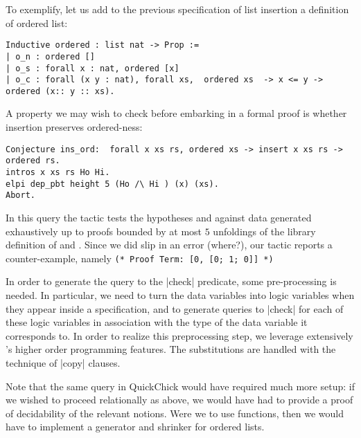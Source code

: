 To exemplify, let us add to the previous specification of list
insertion a definition of ordered list:
\begin{lstlisting}
Inductive ordered : list nat -> Prop :=
| o_n : ordered []
| o_s : forall x : nat, ordered [x]
| o_c : forall (x y : nat), forall xs,  ordered xs  -> x <= y -> ordered (x:: y :: xs).     
\end{lstlisting}
%
A property we may wish to check before embarking in a formal proof is whether insertion preserves ordered-ness:
\begin{lstlisting}
Conjecture ins_ord:  forall x xs rs, ordered xs -> insert x xs rs -> ordered rs.
intros x xs rs Ho Hi.
elpi dep_pbt height 5 (Ho /\ Hi ) (x) (xs).
Abort.
\end{lstlisting}
In this query the tactic tests the hypotheses  and 
against data  generated exhaustively up to proofs bounded
by at most $5$ unfoldings of the library  definition
of  and . Since we did slip in an error (where?), our
tactic reports a counter-example, namely
\verb|(* Proof Term: [0, [0; 1; 0]] *)|


In order to generate the query to the \lsti|check| predicate, some
pre-processing is needed. In particular, we need to turn the data
variables into \lP logic variables when they appear inside a
specification, and to generate queries to \lsti|check| for each of
these logic variables in association with the type of the data
variable it corresponds to.  In order to realize this preprocessing step,
we leverage extensively \lP's higher order programming features. The
substitutions are handled with the technique of \lsti|copy| clauses.


Note that the same query in \textsf{QuickChick} would have required
much more setup: if we wished to proceed relationally as above, we
would have had to provide a proof of decidability of the relevant
notions. Were we to use functions, then we would have to implement a
generator and shrinker for ordered lists.



